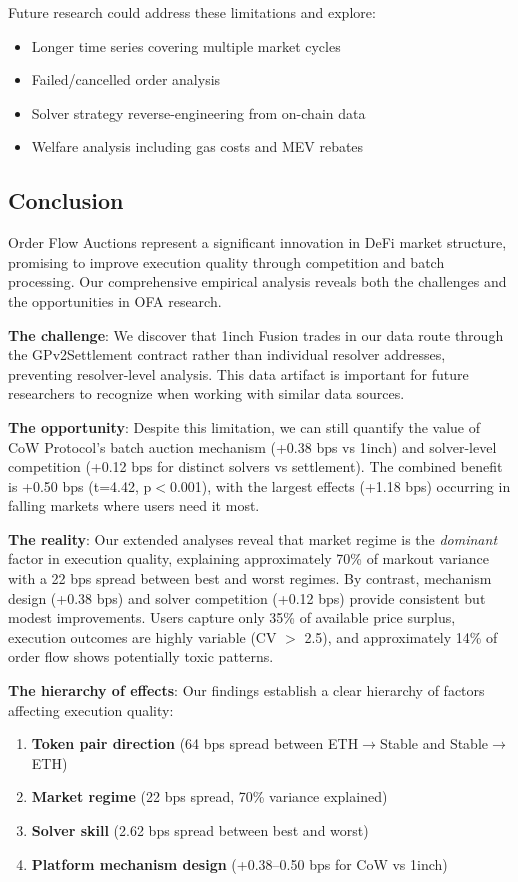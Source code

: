 \documentclass[12pt,a4paper]{article}
\begin{document}
Future research could address these limitations and explore:
\begin{itemize}
    \item Longer time series covering multiple market cycles
    \item Failed/cancelled order analysis
    \item Solver strategy reverse-engineering from on-chain data
    \item Welfare analysis including gas costs and MEV rebates
\end{itemize}

\subsection{Conclusion}

Order Flow Auctions represent a significant innovation in DeFi market structure, promising to improve execution quality through competition and batch processing. Our comprehensive empirical analysis reveals both the challenges and the opportunities in OFA research.

\textbf{The challenge}: We discover that 1inch Fusion trades in our data route through the GPv2Settlement contract rather than individual resolver addresses, preventing resolver-level analysis. This data artifact is important for future researchers to recognize when working with similar data sources.

\textbf{The opportunity}: Despite this limitation, we can still quantify the value of CoW Protocol's batch auction mechanism (+0.38 bps vs 1inch) and solver-level competition (+0.12 bps for distinct solvers vs settlement). The combined benefit is +0.50 bps (t=4.42, p$<$0.001), with the largest effects (+1.18 bps) occurring in falling markets where users need it most.

\textbf{The reality}: Our extended analyses reveal that market regime is the \textit{dominant} factor in execution quality, explaining approximately 70\% of markout variance with a 22 bps spread between best and worst regimes. By contrast, mechanism design (+0.38 bps) and solver competition (+0.12 bps) provide consistent but modest improvements. Users capture only 35\% of available price surplus, execution outcomes are highly variable (CV $>$ 2.5), and approximately 14\% of order flow shows potentially toxic patterns.

\textbf{The hierarchy of effects}: Our findings establish a clear hierarchy of factors affecting execution quality:
\begin{enumerate}
    \item \textbf{Token pair direction} (64 bps spread between ETH$\rightarrow$Stable and Stable$\rightarrow$ETH)
    \item \textbf{Market regime} (22 bps spread, 70\% variance explained)
    \item \textbf{Solver skill} (2.62 bps spread between best and worst)
    \item \textbf{Platform mechanism design} (+0.38--0.50 bps for CoW vs 1inch)
\end{enumerate}
\end{document}
